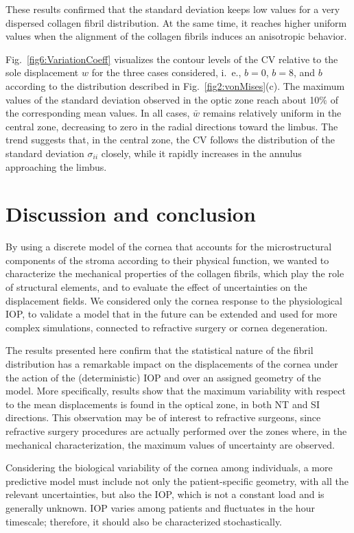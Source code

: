\documentclass[preprint,12pt]{elsarticle}
\begin{document}
These results confirmed that the standard deviation keeps low values for a very dispersed collagen fibril distribution. At the same time, it reaches higher uniform values when the alignment of the collagen fibrils induces an anisotropic behavior. 
 
Fig.~\ref{fig6:VariationCoeff} visualizes the contour levels of the CV relative to the sole displacement $w$ for the three cases considered, i.~e., $b=0$, $b=8$, and $b$ according to the distribution described in Fig.~\ref{fig2:vonMises}(c). The maximum values of the standard deviation observed in the optic zone reach about 10$\%$ of the corresponding mean values. In all cases, $\bar w$ remains relatively uniform in the central zone, decreasing to zero in the radial directions toward the limbus. The trend suggests that, in the central zone, the CV follows the distribution of the standard deviation $\sigma_{ii}$ closely, while it rapidly increases in the annulus approaching the limbus. 


\section{Discussion and conclusion}
\label{sec:fR}

By using a discrete model of the cornea that accounts for the microstructural components of the stroma according to their physical function, we wanted to characterize the mechanical properties of the collagen fibrils, which play the role of structural elements, and to evaluate the effect of uncertainties on the displacement fields. We considered only the cornea response to the physiological IOP, to validate a model that in the future can be extended and used for more complex simulations, connected to refractive surgery or cornea degeneration. 

The results presented here confirm that the statistical nature of the fibril distribution has a remarkable impact on the displacements of the cornea under the action of the (deterministic) IOP and over an assigned geometry of the model. More specifically, results show that the maximum variability with respect to the mean displacements is found in the optical zone, in both NT and SI directions. This observation may be of interest to refractive surgeons, since refractive surgery procedures are actually performed over the zones where, in the mechanical characterization, the maximum values of uncertainty are observed.

Considering the biological variability of the cornea among individuals, a more predictive model must include not only the patient-specific geometry, with all the relevant uncertainties, but also the IOP, which is not a constant load and is generally unknown. IOP varies among patients and fluctuates in the hour timescale; therefore, it should also be characterized stochastically.
\end{document}
